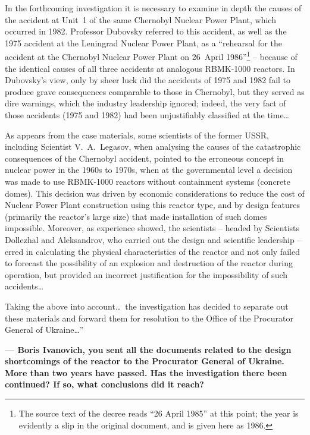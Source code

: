 \documentclass[openright]{bookest}
\begin{document}
In the forthcoming investigation it is necessary to examine in depth the causes of the accident at Unit~1 of the same Chernobyl Nuclear Power Plant, which occurred in 1982. Professor Dubovsky referred to this accident, as well as the 1975 accident at the Leningrad Nuclear Power Plant, as a ``rehearsal for the accident at the Chernobyl Nuclear Power Plant on 26~April 1986''\footnote{The source text of the decree reads ``26 April 1985'' at this point; the year is evidently a slip in the original document, and is given here as 1986.} -- because of the identical causes of all three accidents at analogous RBMK-1000 reactors. In Dubovsky's view, only by sheer luck did the accidents of 1975 and 1982 fail to produce grave consequences comparable to those in Chernobyl, but they served as dire warnings, which the industry leadership ignored; indeed, the very fact of those accidents (1975 and 1982) had been unjustifiably classified at the time\ldots

As appears from the case materials, some scientists of the former USSR, including Scientist V.~A.~Legasov, when analysing the causes of the catastrophic consequences of the Chernobyl accident, pointed to the erroneous concept in nuclear power in the 1960s to 1970s, when at the governmental level a decision was made to use RBMK-1000 reactors without containment systems (concrete domes). This decision was driven by economic considerations to reduce the cost of Nuclear Power Plant construction using this reactor type, and by design features (primarily the reactor's large size) that made installation of such domes impossible. Moreover, as experience showed, the scientists -- headed by Scientists Dollezhal and Aleksandrov, who carried out the design and scientific leadership -- erred in calculating the physical characteristics of the reactor and not only failed to forecast the possibility of an explosion and destruction of the reactor during operation, but provided an incorrect justification for the impossibility of such accidents\ldots

Taking the above into account\ldots~the investigation has decided to separate out these materials and forward them for resolution to the Office of the Procurator General of Ukraine\ldots''

\medskip

\textbf{--- Boris Ivanovich, you sent all the documents related to the design shortcomings of the reactor to the Procurator General of Ukraine. More than two years have passed. Has the investigation there been continued? If so, what conclusions did it reach?}
\end{document}
